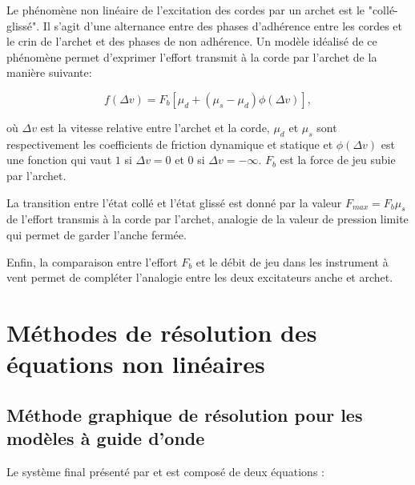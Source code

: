 \documentclass[atiam, article]{rapport} %
\begin{document}
Le phénomène non linéaire de l'excitation des cordes par un archet est le "collé-glissé". Il s'agit d'une alternance entre des phases d'adhérence entre les cordes et le crin de l'archet et des phases de non adhérence. Un modèle idéalisé de ce phénomène permet d'exprimer l'effort transmit à la corde par l'archet de la manière suivante:

$$f(\Delta v) = F_b[\mu _d +(\mu_s - \mu_d) \phi(\Delta v)],$$

où $\Delta v$ est la vitesse relative entre l'archet et la corde, $\mu _d$ et $\mu _s$ sont respectivement les coefficients de friction dynamique et statique et $\phi(\Delta v)$ est une fonction qui vaut $1$ si $\Delta v = 0$ et $0$ si $\Delta v = -\infty$. $F_b$ est la force de jeu subie par l'archet.

La transition entre l'état collé et l'état glissé est donné par la valeur $F_{max} = F_b \mu_s$ de l'effort transmis à la corde par l'archet, analogie de la valeur de pression limite qui permet de garder l'anche fermée.

Enfin, la comparaison entre l'effort $F_b$ et le débit de jeu dans les instrument à vent permet de compléter l'analogie entre les deux excitateurs anche et archet.

\section{Méthodes de résolution des équations non linéaires}\label{sec : méthode de résolution des equations non linéaires}

\subsection{Méthode graphique de résolution pour les modèles à guide d'onde}

Le système final présenté par \cite{mcintyre_oscillations_1983} et \cite{maganza_bifurcations_1986} est composé de deux équations :
\end{document}
